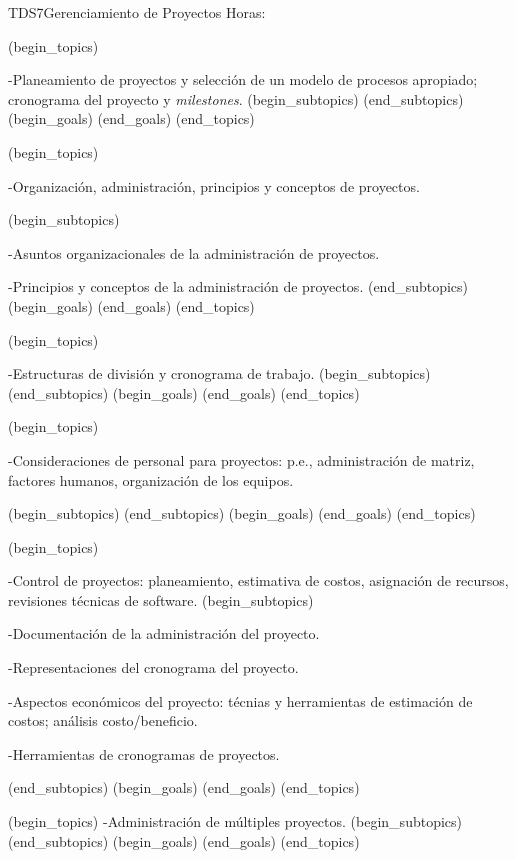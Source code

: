\begin{BKL2}{TDS7}{Gerenciamiento de Proyectos}
Horas:
 
(begin_topics)

-Planeamiento de proyectos y selección de un modelo de procesos apropiado; cronograma del proyecto y \textit{milestones}.
(begin_subtopics)
(end_subtopics)
(begin_goals)
(end_goals)
(end_topics)

 

(begin_topics)

-Organización, administración, principios y conceptos de proyectos.

(begin_subtopics)

-Asuntos organizacionales de la administración de proyectos.

-Principios y conceptos de la administración de proyectos.
(end_subtopics)
(begin_goals)
(end_goals)
(end_topics)

 

(begin_topics)

-Estructuras de división y cronograma de trabajo.
(begin_subtopics)
(end_subtopics)
(begin_goals)
(end_goals)
(end_topics)

 

(begin_topics)

-Consideraciones de personal para proyectos: p.e., administración de matriz, factores humanos, organización de los equipos.

(begin_subtopics)
(end_subtopics)
(begin_goals)
(end_goals)
(end_topics)

 

(begin_topics)

-Control de proyectos: planeamiento, estimativa de costos, asignación de recursos, revisiones técnicas de software.
(begin_subtopics)

-Documentación de la administración del proyecto.

-Representaciones del cronograma del proyecto.

-Aspectos económicos del proyecto: técnias y herramientas de estimación de costos; análisis costo/beneficio.

-Herramientas de cronogramas de proyectos.

(end_subtopics)
(begin_goals)
(end_goals)
(end_topics)

 

(begin_topics)
-Administración de múltiples proyectos.
(begin_subtopics)
(end_subtopics)
(begin_goals)
(end_goals)
(end_topics)

 


\end{BKL2}
